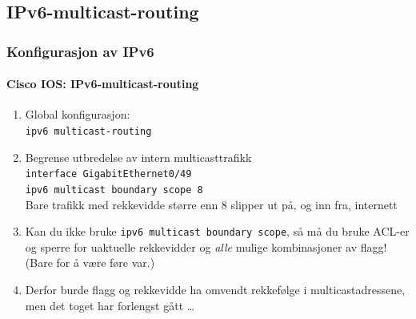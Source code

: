 \subsection{IPv6-multicast-routing}
\begin{frame}%
  \frametitle{Konfigurasjon av IPv6}
  \framesubtitle{Cisco IOS: IPv6-multicast-routing}
  \begin{enumerate}[<+->]
  \item Global konfigurasjon:\\
    \alert{\texttt{ipv6 multicast-routing}}\\
  \item Begrense utbredelse av intern multicasttrafikk\\
    \alert{\texttt{interface GigabitEthernet0/49}}\\
    \alert{\texttt{ipv6 multicast boundary scope 8}}\\
    Bare trafikk med rekkevidde større enn 8 slipper ut på, og inn
    fra, internett
  \item Kan du ikke bruke \texttt{ipv6 multicast boundary scope}, så
    må du bruke ACL-er og sperre for uaktuelle rekkevidder og
    \textit{alle\/} mulige kombinasjoner av flagg! (Bare for å være
    føre var.)
  \item Derfor burde flagg og rekkevidde ha omvendt rekkefølge i
    multicastadressene, men det toget har forlengst gått \dots
  \end{enumerate}
\end{frame}

